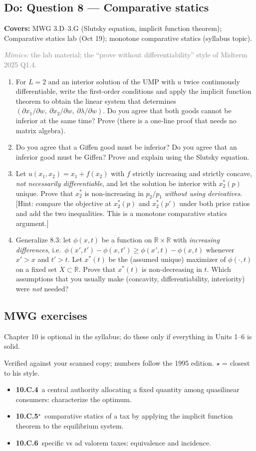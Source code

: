 \documentclass[11pt]{article}
\newcommand{\R}{\mathbb{R}}
\newcommand{\covers}[1]{\par\noindent\textcolor{blue!60!black}{\small\textbf{Covers:} #1}\medskip}
\newcommand{\mimic}[1]{\par\noindent\textcolor{gray}{\small\textit{Mimics:} #1}\medskip}
\begin{document}
\subsection{Do: Question 8 --- Comparative statics}
\covers{MWG 3.D--3.G (Slutsky equation, implicit function theorem); Comparative statics lab (Oct 19); monotone comparative statics (syllabus topic).}
\mimic{the lab material; the ``prove without differentiability'' style of Midterm 2025 Q1.4.}

\begin{enumerate}[label=\textbf{8.\arabic*}]
  \item For $L=2$ and an interior solution of the UMP with $u$ twice continuously differentiable, write the first-order conditions and apply the implicit function theorem to obtain the linear system that determines $(\partial x_1/\partial w,\ \partial x_2/\partial w,\ \partial\lambda/\partial w)$. Do you agree that both goods cannot be inferior at the same time? Prove (there is a one-line proof that needs no matrix algebra).
  \item Do you agree that a Giffen good must be inferior? Do you agree that an inferior good must be Giffen? Prove and explain using the Slutsky equation.
  \item Let $u(x_1,x_2)=x_1+f(x_2)$ with $f$ strictly increasing and strictly concave, \emph{not necessarily differentiable}, and let the solution be interior with $x_2^*(p)$ unique. Prove that $x_2^*$ is non-increasing in $p_2/p_1$ \emph{without using derivatives}. [Hint: compare the objective at $x_2^*(p)$ and $x_2^*(p')$ under both price ratios and add the two inequalities. This is a monotone comparative statics argument.]
  \item Generalize 8.3: let $\phi(x,t)$ be a function on $\R\times\R$ with \emph{increasing differences}, i.e.\ $\phi(x',t')-\phi(x,t')\ge\phi(x',t)-\phi(x,t)$ whenever $x'>x$ and $t'>t$. Let $x^*(t)$ be the (assumed unique) maximizer of $\phi(\cdot,t)$ on a fixed set $X\subset\R$. Prove that $x^*(t)$ is non-decreasing in $t$. Which assumptions that you usually make (concavity, differentiability, interiority) were \emph{not} needed?
\end{enumerate}


\subsection{MWG exercises}
Chapter 10 is optional in the syllabus; do these only if everything in Units 1--6 is solid.
\begin{todo}{Verified against your scanned copy; numbers follow the 1995 edition. $\star$ = closest to his style.}
\begin{itemize}
\item \textbf{10.C.4}\ a central authority allocating a fixed quantity among quasilinear consumers: characterize the optimum.
\item \textbf{10.C.5}$^\star$\ comparative statics of a tax by applying the implicit function theorem to the equilibrium system.
\item \textbf{10.C.6}\ specific vs ad valorem taxes: equivalence and incidence.
\end{itemize}
\end{todo}
\end{document}
